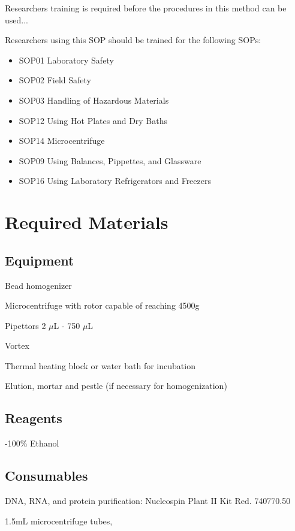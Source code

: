 \documentclass[12pt]{../SOP3_alpha}\usepackage[]{graphicx}\usepackage[]{color}
\begin{document}
\NP Researchers training is required before the procedures in this method can be used... 

\NP Researchers using this SOP should be trained for the following SOPs:

\begin{itemize}
  \item SOP01 Laboratory Safety
  \item SOP02 Field Safety
  \item SOP03 Handling of Hazardous Materials
  \item SOP12 Using Hot Plates and Dry Baths
  \item SOP14 Microcentrifuge
  \item SOP09 Using Balances, Pippettes, and Glassware
  \item SOP16 Using Laboratory Refrigerators and Freezers
\end{itemize}


\section{Required Materials}

\subsection{Equipment}

\NP Bead homogenizer

\NP Microcentrifuge with rotor capable of reaching 4500g

\NP Pipettors 2 $\mu$L - 750 $\mu$L

\NP Vortex

\NP Thermal heating block or water bath for incubation

\NP Elution, mortar and pestle (if necessary for homogenization)

\subsection*{Reagents}

-100\% Ethanol 

\subsection*{Consumables}

\NP DNA, RNA, and protein purification: Nucleospin Plant II Kit Red. 740770.50

\NP 1.5mL microcentrifuge tubes, 
\end{document}
